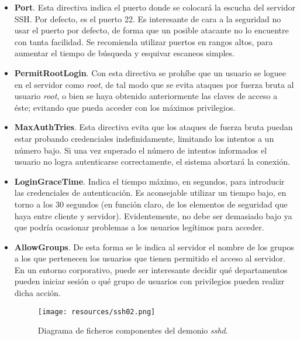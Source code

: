\documentclass[a4paper, 11pt, titlepage]{article}
\begin{document}
        \begin{itemize}
            \item \textbf{Port}. Esta directiva indica el puerto donde se colocará la escucha del servidor 
            SSH. Por defecto, es el puerto 22. Es interesante de cara a la seguridad no usar el puerto por defecto, 
            de forma que un posible atacante no lo encuentre con tanta facilidad. Se recomienda utilizar puertos en 
            rangos altos, para aumentar el tiempo de búsqueda y esquivar escaneos simples.
            \item \textbf{PermitRootLogin}. Con esta directiva se prohíbe que un usuario se loguee en el servidor
            como \textit{root}, de tal modo que se evita ataques por fuerza bruta al usuario \textit{root}, o 
            bien se haya obtenido anteriormente las claves de acceso a éste; evitando que pueda acceder con 
            los máximos privilegios.
            \item \textbf{MaxAuthTries}. Esta directiva evita que los ataques de fuerza bruta puedan estar probando 
            credenciales indefinidamente, limitando los intentos a un número bajo. Si una vez superado el número de 
            intentos informados el usuario no logra autenticarse correctamente, el sistema abortará la conexión.
            \item \textbf{LoginGraceTime}. Indica el tiempo máximo, en segundos, para introducir las credenciales de 
            autenticación. Es aconsejable utilizar un tiempo bajo, en torno a los 30 segundos (en función claro, de los 
            elementos de seguridad que haya entre cliente y servidor). Evidentemente, no debe ser demasiado bajo 
            ya que podría ocasionar problemas a los usuarios legítimos para acceder.
            \item \textbf{AllowGroups}. De esta forma se le indica al servidor el nombre de los grupos a los que 
            pertenecen los usuarios que tienen permitido el acceso al servidor. En un entorno corporativo, puede ser 
            interesante decidir qué departamentos pueden iniciar sesión o qué grupo de usuarios con privilegios 
            pueden realizr dicha acción.

            \begin{figure}[htp]
                \centering
                \texttt{[image: resources/ssh02.png]}
                \caption{Diagrama de ficheros componentes del demonio \textit{sshd}.}
                \label{ssh02}
            \end{figure}        


\end{itemize}
\end{document}
